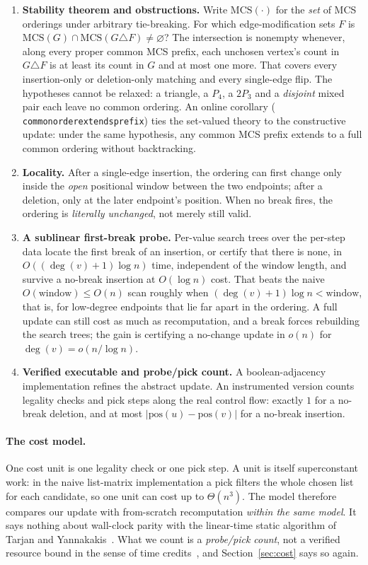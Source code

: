 \documentclass[11pt]{article}
\theoremstyle{definition}
\theoremstyle{remark}
\newcommand{\leanname}[1]{%
  \texttt{\begingroup\def\_{\textunderscore\allowbreak}#1\endgroup}}
\newcommand{\mcso}{\mathrm{MCS}}
\begin{document}
\begin{enumerate}
\item \textbf{Stability theorem and obstructions.} Write $\mcso(\cdot)$ for the
\emph{set} of MCS orderings under arbitrary tie-breaking. For which
edge-modification sets $F$ is $\mcso(G)\cap\mcso(G\triangle F)\neq\varnothing$?
The intersection is nonempty whenever, along every proper common MCS prefix,
each unchosen vertex's count in $G\triangle F$ is at least its count in $G$ and
at most one more. That covers every
insertion-only or deletion-only matching and every single-edge flip. The
hypotheses cannot be relaxed: a triangle, a $P_4$, a $2P_3$ and a
\emph{disjoint} mixed pair each leave no common ordering. An online corollary
(\leanname{common\_order\_extends\_prefix}) ties the set-valued theory to the
constructive update: under the same hypothesis, any common MCS prefix extends to
a full common ordering without backtracking.
\item \textbf{Locality.} After a single-edge insertion, the ordering can first
change only inside the \emph{open} positional window between the two endpoints;
after a deletion, only at the later endpoint's position. When no break fires, the
ordering is \emph{literally unchanged}, not merely still valid.
\item \textbf{A sublinear first-break probe.} Per-value search trees over the
per-step data locate the first break of an insertion, or certify that there is
none, in $O((\deg(v)+1)\log n)$ time, independent of the window length, and
survive a no-break insertion at $O(\log n)$ cost. That beats the
naive $O(\text{window})\le O(n)$ scan roughly when
$(\deg(v)+1)\log n < \text{window}$, that is, for low-degree endpoints that lie
far apart in the ordering. A full update can still cost as much as
recomputation, and a break forces rebuilding the search trees; the gain is
certifying a no-change update in $o(n)$ for $\deg(v)=o(n/\log n)$.
\item \textbf{Verified executable and probe/pick count.} A boolean-adjacency
implementation refines the abstract update. An instrumented version counts
legality checks and pick steps along the real control flow: exactly $1$ for a
no-break deletion, and at most $|\mathrm{pos}(u)-\mathrm{pos}(v)|$ for a no-break
insertion.
\end{enumerate}

\paragraph{The cost model.} One cost unit is one legality check or one pick
step. A unit is itself superconstant work: in the naive list-matrix
implementation a pick filters the whole chosen list for each candidate, so one
unit can cost up to $\Theta(n^{3})$. The model therefore compares our update with
from-scratch recomputation \emph{within the same model}. It says nothing about
wall-clock parity with the linear-time static algorithm of Tarjan and
Yannakakis~\cite{tarjan1984mcs}. What we count is a \emph{probe/pick count}, not
a verified resource bound in the sense of time credits~\cite{gueneau2019formal},
and Section~\ref{sec:cost} says so again.
\end{document}
